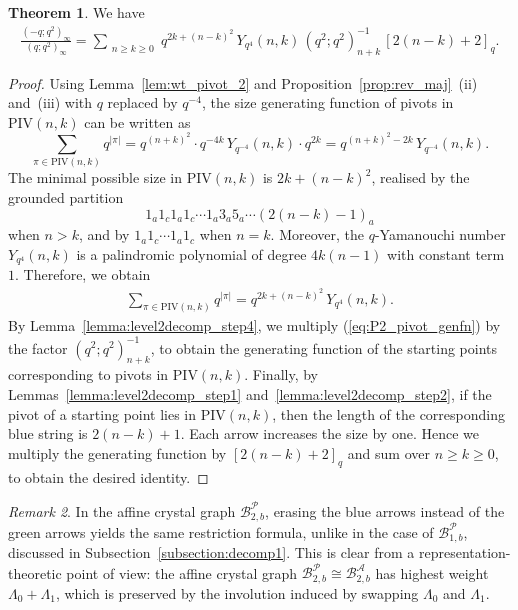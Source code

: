\documentclass[11pt]{article}
\theoremstyle{definition}
\newtheorem{theorem}{Theorem}[section]
\theoremstyle{remark}
\newtheorem{remark}[theorem]{Remark}
\theoremstyle{definition}
\numberwithin{equation}{section}
\begin{document}
\begin{theorem} We have
\begin{align*}
\frac{(-q;q^2)_\infty}{(q;q^2)_\infty} = \sum_{\substack{n\geq k\geq 0}}q^{2k+(n-k)^2}\,Y_{q^4}(n,k)\,(q^2;q^2)_{n+k}^{-1}\,[2(n-k)+2]_q.
\end{align*}
\end{theorem}
\begin{proof}
  Using Lemma~\ref{lem:wt_pivot_2} and
  Proposition~\ref{prop:rev_maj}~(ii) and~(iii) with \(q\) replaced by
  \(q^{-4}\), the size generating function of pivots in
  \(\mathrm{PIV}(n,k)\) can be written as
  \[
    \sum_{\pi \in \mathrm{PIV}(n,k)} q^{|\pi|}
    = q^{(n+k)^2}\cdot q^{-4k}\,Y_{q^{-4}}(n,k)\cdot q^{2k} 
    = q^{(n+k)^2-2k}\,Y_{q^{-4}}(n,k).
  \]
  The minimal possible size in \(\mathrm{PIV}(n,k)\) is
  \(2k + (n-k)^2\), realised by the grounded partition
  \[
    1_a1_c1_a1_c\cdots1_a3_a5_a\cdots(2(n-k)-1)_a
  \]
  when \(n>k\), and by \(1_a1_c\cdots1_a1_c\) when \(n=k\). Moreover,
  the \( q \)-Yamanouchi number \(Y_{q^4}(n,k)\) is a palindromic
  polynomial of degree \(4k(n-1)\) with constant term \(1\).
  Therefore, we obtain
  \begin{align}\label{eq:P2_pivot_genfn}
    \sum_{\pi \in \mathrm{PIV}(n,k)} q^{|\pi|}
    = q^{2k+(n-k)^2}\,Y_{q^4}(n,k).
  \end{align}
  By Lemma~\ref{lemma:level2decomp_step4}, we multiply
  (\ref{eq:P2_pivot_genfn}) by the factor \((q^2;q^2)_{n+k}^{-1}\), to
  obtain the generating function of the starting points corresponding
  to pivots in \(\mathrm{PIV}(n,k)\). Finally, by
  Lemmas~\ref{lemma:level2decomp_step1}
  and~\ref{lemma:level2decomp_step2}, if the pivot of a starting point
  lies in \(\mathrm{PIV}(n,k)\), then the length of the corresponding
  blue string is \(2(n-k)+1\). Each arrow increases the size by one.
  Hence we multiply the generating function by \([2(n-k)+2]_q\) and
  sum over \(n\geq k\geq 0\), to obtain the desired identity.
\end{proof}

\begin{remark}
In the affine crystal graph $\mathcal{B}_{2,b}^{\mathcal{P}}$, erasing the blue arrows instead of the green arrows yields the same restriction formula, unlike in the case of $\mathcal{B}_{1,b}^{\mathcal{P}}$, discussed in Subsection~\ref{subsection:decomp1}. This is clear from a representation-theoretic point of view: the affine crystal graph $\mathcal{B}_{2,b}^{\mathcal{P}}\cong\mathcal{B}_{2,b}^{\mathcal{A}}$ has highest weight $\Lambda_0+\Lambda_1$, which is preserved by the involution induced by swapping $\Lambda_0$ and $\Lambda_1$.
\end{remark}

\let\clearpage\oldclearpage

\printbibliography
\end{document}
